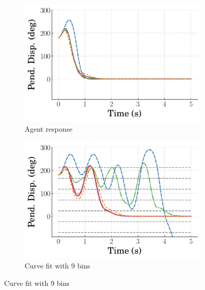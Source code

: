 %
\begin{figure}
    \centering
    \begin{subfigure}[b]{0.32\textwidth}
        \centering
        \includegraphics[width=\textwidth]{figures/figures_Interpretability/Mean_ISE_Inverted_Pendulum-v0_cubic_9_bins/Curve_fit_time_responses/switch_lqr/agent_Pend_Disp_180.pdf}
        \caption{Agent response}
        \label{subfig_chap5:S_RL_LQR_180_init_agent}
    \end{subfigure}
    \hfill
    \begin{subfigure}[b]{0.32\textwidth}
        \centering
        \includegraphics[width=\textwidth]{figures/figures_Interpretability/Mean_ISE_Inverted_Pendulum-v0_cubic_9_bins/Curve_fit_time_responses/switch_lqr/curve_fit_Pend_Disp_180.pdf}
        \caption{Curve fit with 9 bins}
        \label{subfig_chap5:S_RL_LQR_180_init_curve_fit_9_bins_unclipped}
    \end{subfigure}

\end{figure}

